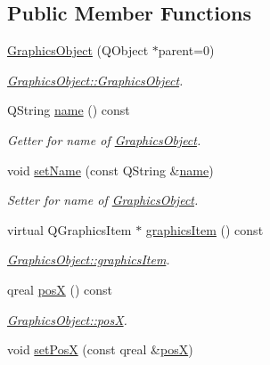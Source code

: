 \subsection*{Public Member Functions}
\begin{DoxyCompactItemize}
\item 
\hyperlink{class_graphics_object_a44e1449dabf506461850b88392c26ce2}{Graphics\+Object} (Q\+Object $\ast$parent=0)
\begin{DoxyCompactList}\small\item\em \hyperlink{class_graphics_object_a44e1449dabf506461850b88392c26ce2}{Graphics\+Object\+::\+Graphics\+Object}. \end{DoxyCompactList}\item 
Q\+String \hyperlink{class_graphics_object_ac5591ff2b8009451c593d1197ce7a162}{name} () const
\begin{DoxyCompactList}\small\item\em Getter for name of \hyperlink{class_graphics_object}{Graphics\+Object}. \end{DoxyCompactList}\item 
void \hyperlink{class_graphics_object_a1b0c7c7f87e86833a9a23ab1a2b6f685}{set\+Name} (const Q\+String \&\hyperlink{class_graphics_object_ac5591ff2b8009451c593d1197ce7a162}{name})
\begin{DoxyCompactList}\small\item\em Setter for name of \hyperlink{class_graphics_object}{Graphics\+Object}. \end{DoxyCompactList}\item 
virtual Q\+Graphics\+Item $\ast$ \hyperlink{class_graphics_object_abd625951730f006e748570bf00d158bf}{graphics\+Item} () const
\begin{DoxyCompactList}\small\item\em \hyperlink{class_graphics_object_abd625951730f006e748570bf00d158bf}{Graphics\+Object\+::graphics\+Item}. \end{DoxyCompactList}\item 
qreal \hyperlink{class_graphics_object_a0141eaaf7ab936a2630183c403257026}{posX} () const
\begin{DoxyCompactList}\small\item\em \hyperlink{class_graphics_object_a0141eaaf7ab936a2630183c403257026}{Graphics\+Object\+::posX}. \end{DoxyCompactList}\item 
void \hyperlink{class_graphics_object_ac355db089d870d194e5961921d5626e3}{set\+PosX} (const qreal \&\hyperlink{class_graphics_object_a0141eaaf7ab936a2630183c403257026}{posX})

\end{DoxyCompactItemize}
